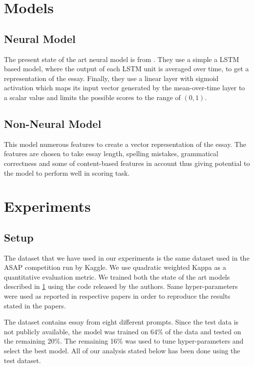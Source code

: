 \documentclass[11pt,a4paper]{article}
\begin{document}
\section{Models}\label{sec:models}

\subsection{Neural Model}

The present state of the art neural model is from \cite{taghipour2016neural}. They use a simple a LSTM based model, where the output of each LSTM unit is averaged over time, to get a representation of the essay. Finally, they use a linear layer with sigmoid activation which maps its input vector generated by the mean-over-time layer to a scalar value and limits the possible scores to the range of $(0, 1)$.

\subsection{Non-Neural Model}
This model numerous features to create a vector representation of the essay. The features are chosen to take essay length, spelling mistakes, grammatical correctness and some of content-based features in account thus giving potential to the model to perform well in scoring task.


\section{Experiments}

\subsection{Setup}
The dataset that we have used in our experiments is the same dataset used in the ASAP competition run by Kaggle. We use quadratic weighted Kappa as a quantitative evaluation metric. We trained both the state of the art models described in \cref{sec:models} using the code released by the authors. Same hyper-parameters were used as reported in respective papers in order to reproduce the results stated in the papers.

The dataset contains essay from eight different prompts. Since the test data is not publicly available, the model was trained on 64\% of the data and tested on the remaining 20\%. The remaining 16\% was used to tune hyper-parameters and select the best model.
All of our analysis stated below has been done using the test dataset.
\end{document}
